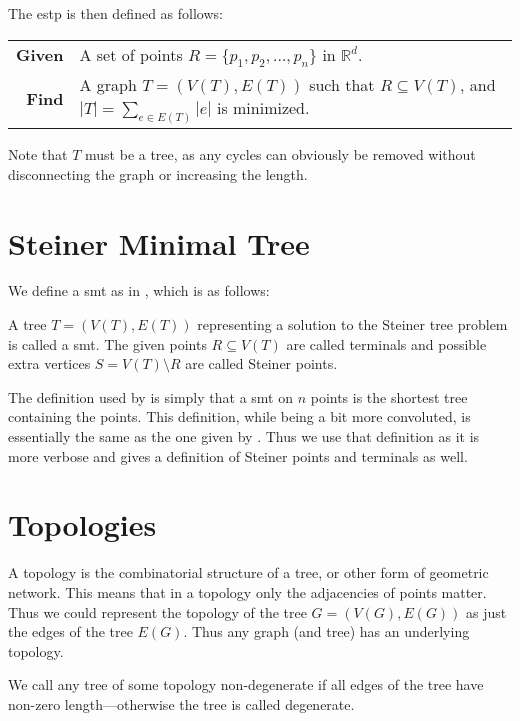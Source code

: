 The \ac{estp} is then defined as follows:
%
\begin{center}
  \begin{tabular}{rp{9cm}}
    \toprule
    \textbf{Given} & A set of points $R = \{ p_1, p_2, \ldots, p_n \}$ in
                     $\mathbb{R}^d$. \\
    \textbf{Find} & A graph $T = (V(T), E(T))$ such that $R \subseteq V(T)$, and
                    $|T| = \sum_{e \in E(T)} |e|$ is minimized. \\
    \bottomrule
  \end{tabular}
\end{center}
%
Note that $T$ must be a tree, as any cycles can obviously be removed
without disconnecting the graph or increasing the length.

\section{Steiner Minimal Tree}
\label{sec:steiner-minimal-tree}

We define a \ac{smt} as in \textcite{brazil2015}, which is as follows:
%
\begin{definition}
  A tree $T = (V(T), E(T))$ representing a solution to the Steiner tree problem
  is called a \acl{smt}. The given points $R \subseteq V(T)$ are called
  terminals and possible extra vertices $S = V(T) \setminus R$ are called
  Steiner points.
\end{definition}
%
The definition used by \textcite{smith1992} is simply that a \ac{smt} on $n$
points is the shortest tree containing the points. This definition, while being
a bit more convoluted, is essentially the same as the one given by
\textcite{brazil2015}. Thus we use that definition as it is more verbose and
gives a definition of Steiner points and terminals as well.

\section{Topologies}
\label{sec:topologies-1}

A topology is the combinatorial structure of a tree, or other form of geometric
network. This means that in a topology only the adjacencies of points
matter. Thus we could represent the topology of the tree $G = (V(G), E(G))$ as
just the edges of the tree $E(G)$. Thus any graph (and tree) has an
underlying topology.

We call any tree of some topology non-degenerate if all edges of the tree have
non-zero length---otherwise the tree is called degenerate.

